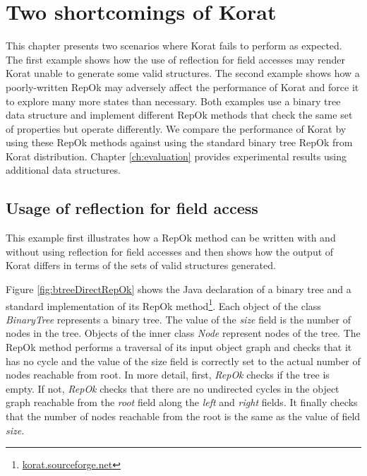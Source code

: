 \chapter{Two shortcomings of Korat}
\label{ch:shortcomings-of-korat}
This chapter presents two scenarios where
Korat fails to perform as expected.  The first
example shows how the use of reflection for field accesses may render
Korat unable to generate some valid structures.  The second example
shows how a poorly-written RepOk may adversely affect the performance
of Korat and force it to explore many more states than necessary.
Both examples use a binary tree data structure and implement different
RepOk methods that check the same set of properties but operate
differently.  We compare the performance of Korat by using these RepOk
methods against using the standard binary tree RepOk from Korat
distribution.  Chapter \ref{ch:evaluation} provides experimental
results using additional data structures.

\section{Usage of reflection for field access}
\label{sec:usage-of-reflection-for-field-access}
This example first illustrates how a RepOk method can be written with
and without using reflection for field accesses and then shows how the
output of Korat differs in terms of the sets of valid structures
generated.

\para
Figure \ref{fig:btreeDirectRepOk} shows the Java declaration of a
binary tree and a standard implementation of its RepOk
method\footnote{\url{korat.sourceforge.net}}. Each object of the class
\emph{BinaryTree} represents a binary tree. The value of the
\emph{size} field is the number of nodes in the tree. Objects of the
inner class \emph{Node} represent nodes of the tree.  The RepOk method
performs a traversal of its input object graph and checks that it has
no cycle and the value of the size field is correctly set to the
actual number of nodes reachable from root.  In more detail, first,
\emph{RepOk} checks if the tree is empty. If not, \emph{RepOk} checks
that there are no undirected cycles in the object graph reachable from
the \emph{root} field along the \emph{left} and \emph{right}
fields. It finally checks that the number of nodes reachable from the
root is the same as the value of field \emph{size}.

